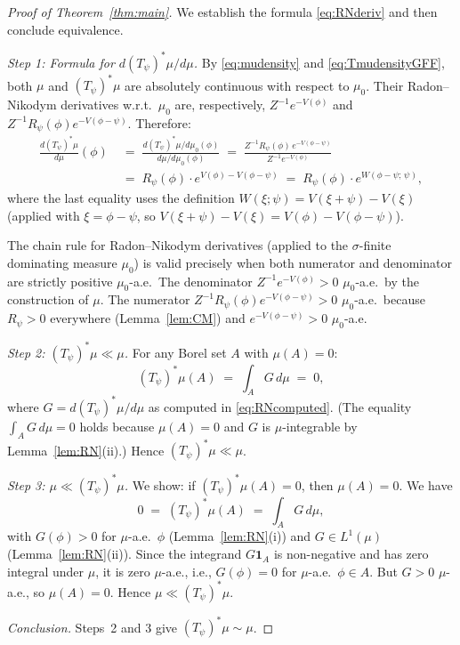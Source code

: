 \documentclass[12pt]{article}
\theoremstyle{definition}
\begin{document}
\begin{proof}[Proof of Theorem~\ref{thm:main}]
We establish the formula \eqref{eq:RNderiv} and then conclude equivalence.

\textit{Step 1: Formula for $d(T_\psi)^*\mu / d\mu$.}
By \eqref{eq:mudensity} and \eqref{eq:TmudensityGFF}, both $\mu$ and $(T_\psi)^*\mu$ are
absolutely continuous with respect to $\mu_0$.  Their Radon--Nikodym derivatives w.r.t.\ $\mu_0$
are, respectively, $Z^{-1}e^{-V(\phi)}$ and $Z^{-1}R_\psi(\phi)e^{-V(\phi-\psi)}$.  Therefore:
\begin{align}
  \frac{d(T_\psi)^*\mu}{d\mu}(\phi)
  &\;=\; \frac{d(T_\psi)^*\mu/d\mu_0(\phi)}{d\mu/d\mu_0(\phi)}
  \;=\; \frac{Z^{-1}R_\psi(\phi)\,e^{-V(\phi-\psi)}}{Z^{-1}e^{-V(\phi)}} \nonumber \\
  &\;=\; R_\psi(\phi)\cdot e^{V(\phi)-V(\phi-\psi)}
  \;=\; R_\psi(\phi)\cdot e^{W(\phi-\psi;\,\psi)},
  \label{eq:RNcomputed}
\end{align}
where the last equality uses the definition $W(\xi;\psi) = V(\xi+\psi)-V(\xi)$
(applied with $\xi = \phi-\psi$, so $V(\xi+\psi) - V(\xi) = V(\phi)-V(\phi-\psi)$).

The chain rule for Radon--Nikodym derivatives (applied to the $\sigma$-finite dominating
measure $\mu_0$) is valid precisely when both numerator and denominator are strictly positive
$\mu_0$-a.e.\ The denominator $Z^{-1}e^{-V(\phi)} > 0$ $\mu_0$-a.e.\ by the construction
of $\mu$.  The numerator $Z^{-1}R_\psi(\phi)e^{-V(\phi-\psi)} > 0$ $\mu_0$-a.e.\ because
$R_\psi>0$ everywhere (Lemma~\ref{lem:CM}) and $e^{-V(\phi-\psi)}>0$ $\mu_0$-a.e.

\textit{Step 2: $(T_\psi)^*\mu \ll \mu$.}
For any Borel set $A$ with $\mu(A) = 0$:
\[
  (T_\psi)^*\mu(A)
  \;=\; \int_A G\,d\mu
  \;=\; 0,
\]
where $G = d(T_\psi)^*\mu/d\mu$ as computed in \eqref{eq:RNcomputed}.  (The equality
$\int_A G\,d\mu = 0$ holds because $\mu(A)=0$ and $G$ is $\mu$-integrable by
Lemma~\ref{lem:RN}(ii).)  Hence $(T_\psi)^*\mu\ll\mu$.

\textit{Step 3: $\mu \ll (T_\psi)^*\mu$.}
We show: if $(T_\psi)^*\mu(A)=0$, then $\mu(A)=0$.  We have
\[
  0 \;=\; (T_\psi)^*\mu(A) \;=\; \int_A G\,d\mu,
\]
with $G(\phi)>0$ for $\mu$-a.e.\ $\phi$ (Lemma~\ref{lem:RN}(i)) and $G\in L^1(\mu)$
(Lemma~\ref{lem:RN}(ii)).  Since the integrand $G\mathbf{1}_A$ is non-negative and has
zero integral under $\mu$, it is zero $\mu$-a.e., i.e., $G(\phi) = 0$ for $\mu$-a.e.\ $\phi\in A$.
But $G>0$ $\mu$-a.e., so $\mu(A) = 0$.  Hence $\mu\ll (T_\psi)^*\mu$.

\textit{Conclusion.}
Steps~2 and 3 give $(T_\psi)^*\mu\sim\mu$.
\end{proof}
\end{document}
